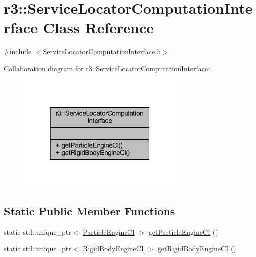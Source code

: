 \hypertarget{classr3_1_1_service_locator_computation_interface}{}\section{r3\+:\+:Service\+Locator\+Computation\+Interface Class Reference}
\label{classr3_1_1_service_locator_computation_interface}


{\ttfamily \#include $<$Service\+Locator\+Computation\+Interface.\+h$>$}



Collaboration diagram for r3\+:\+:Service\+Locator\+Computation\+Interface\+:\nopagebreak
\begin{figure}[H]
\begin{center}
\leavevmode
\includegraphics[width=229pt]{classr3_1_1_service_locator_computation_interface__coll__graph}
\end{center}
\end{figure}
\subsection*{Static Public Member Functions}
\begin{DoxyCompactItemize}
\item 
static std\+::unique\+\_\+ptr$<$ \mbox{\hyperlink{classr3_1_1_particle_engine_c_i}{Particle\+Engine\+CI}} $>$ \mbox{\hyperlink{classr3_1_1_service_locator_computation_interface_abc0c31a51308c4db9932763325c0cb08}{get\+Particle\+Engine\+CI}} ()
\item 
static std\+::unique\+\_\+ptr$<$ \mbox{\hyperlink{classr3_1_1_rigid_body_engine_c_i}{Rigid\+Body\+Engine\+CI}} $>$ \mbox{\hyperlink{classr3_1_1_service_locator_computation_interface_a01d7434be386277d9a9a26d6859472c3}{get\+Rigid\+Body\+Engine\+CI}} ()
\end{DoxyCompactItemize}


